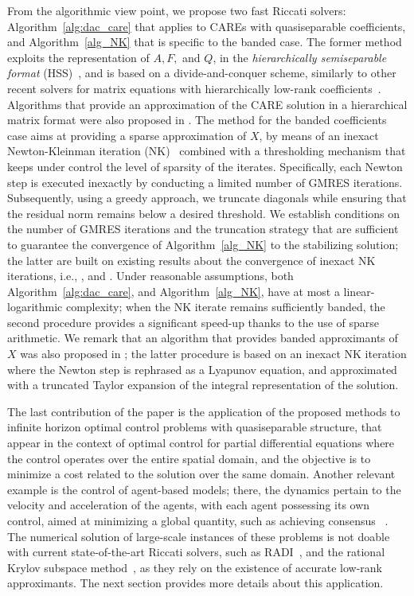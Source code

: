 \documentclass[a4paper,10pt]{article}
\newcommand{\upd}[1]{{\color{black}#1}} %
\begin{document}
From the algorithmic view point, we propose two fast Riccati solvers: Algorithm~\ref{alg:dac_care} that applies to CAREs with quasiseparable coefficients, and Algorithm~\ref{alg_NK} that is specific to the banded case. The former method exploits the representation of $A,F,$ and $Q$, in the \emph{\upd{hierarchically} semiseparable format} (HSS)~\cite{xia10}, and is based on a divide-and-conquer scheme, similarly to other recent solvers for matrix equations with hierarchically low-rank coefficients~\cite{kressner19,kressner20}. Algorithms that provide an approximation of the CARE solution in a hierarchical matrix format were also proposed in \cite{grasedyck08,grasedyck03}. The method for the banded coefficients case aims at providing a sparse approximation of $X$, by means of an inexact Newton-Kleinman iteration (NK)~\cite{kleinman1968iterative} combined with a thresholding mechanism that keeps under control the level of sparsity of the iterates. Specifically, each Newton step is executed inexactly by conducting a limited number of GMRES iterations. Subsequently, using a greedy approach, we truncate diagonals while ensuring that the residual norm remains below a desired threshold. We establish conditions on the number of GMRES iterations and the truncation strategy that are sufficient to guarantee the convergence of Algorithm~\ref{alg_NK} to the stabilizing solution; the latter are built on existing results about the convergence of inexact NK iterations, i.e., \cite[Theorem 4.3]{feitzinger2009inexact}, and \cite[Theorem 10]{benner2016inexact}.  Under reasonable assumptions, both Algorithm~\ref{alg:dac_care}, and Algorithm~\ref{alg_NK}, have at most a linear-logarithmic complexity; when the NK iterate remains sufficiently banded, the second procedure provides a significant speed-up thanks to the use of sparse arithmetic.
We remark that an algorithm that provides banded approximants of $X$  was also proposed in \cite{haber18}; the latter procedure is based on an inexact NK iteration where the Newton step is rephrased as a Lyapunov equation, and approximated  with a truncated Taylor expansion of the integral representation of the solution. 

The last contribution of the paper is the application of the proposed methods to infinite horizon optimal control problems with quasiseparable structure, that appear in the context of optimal control for partial differential equations where the control operates over the entire spatial domain, and the objective is to minimize a cost related to the solution over the same domain. Another relevant example is the control of agent-based models; there, the dynamics pertain to the velocity and acceleration of the agents, with each agent possessing its own control, aimed at minimizing a global quantity, such as achieving consensus ~\cite{cucker2007emergent,bailo2018optimal}.  The numerical solution of large-scale instances of these problems is not doable with current state-of-the-art Riccati solvers, such as RADI~\cite{radi18}, and the rational Krylov subspace method~\cite{simoncini16b}, as they rely on the existence of accurate low-rank approximants. The next section provides more details about this application. 
\end{document}
